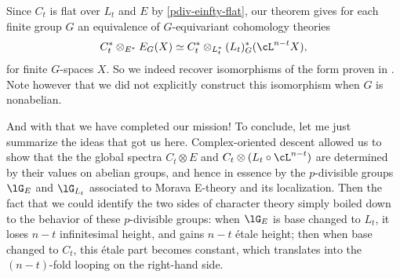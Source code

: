 \begin{remark}
  Since $C_t$ is flat over $L_t$ and $E$ by \cref{pdiv-einfty-flat},
  our theorem gives for each finite group $G$ an equivalence of
  $G$-equivariant cohomology theories
  \[
  C_t^* \otimes_{E^*} E_G(X) \iso
  C_t^* \otimes_{L_t^*} (L_t)_G^*(\cL^{n-t}X),
  \]
  for finite $G$-spaces $X$. So we indeed recover isomorphisms of the
  form proven in \cite{hkr-char,stapleton-tgcm}. Note however that we
  did not explicitly construct this isomorphism when $G$ is
  nonabelian.
\end{remark}

And with that we have completed our mission! To conclude, let me just
summarize the ideas that got us here. Complex-oriented descent allowed
us to show that the the global spectra $C_t \otimes E$ and
$C_t \otimes (L_t \circ \cL^{n-t})$ are determined by their values on
abelian groups, and hence in essence by the $p$-divisible groups
$\lG_E$ and $\lG_{L_t}$ associated to Morava E-theory and its
localization. Then the fact that we could identify the two sides of
character theory simply boiled down to the behavior of these
$p$-divisible groups: when $\lG_E$ is base changed to $L_t$, it loses
$n-t$ infinitesimal height, and gains $n-t$ \'etale height; then when
base changed to $C_t$, this \'etale part becomes constant, which
translates into the $(n-t)$-fold looping on the right-hand side.
